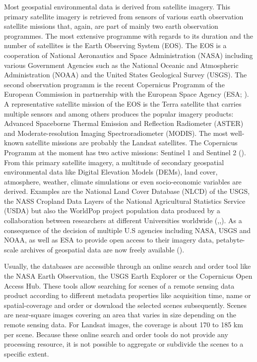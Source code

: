 Most geospatial environmental data is derived from satellite imagery. This primary satellite imagery is retrieved from sensors of various earth observation satellite missions that, again, are part of mainly two earth observation programmes. The most extensive programme with regards to its duration and the number of satellites is the Earth Observing System (EOS). The EOS is a cooperation of National Aeronautics and Space Administration (NASA) including various Government Agencies such as the National Oceanic and Atmospheric Administration (NOAA) and the United States Geological Survey (USGS). The second observation programm is the recent Copernicus Programm of the European Commission in partnership with the European Space Agency (ESA; \cite{salomonson2002overview}). A representative satellite mission of the EOS is the Terra satellite that carries multiple sensors and among others produces the popular imagery products: Advanced Spaceborne Thermal Emission and Reflection Radiometer (ASTER) and Moderate-resolution Imaging Spectroradiometer (MODIS). The most well-known satellite missions are probably the Landsat satellites. The Copernicus Programm at the moment has two active missions: Sentinel 1 and Sentinel 2 (\cite{butler2014earth}).
From this primary satellite imagery, a multitude of secondary geospatial environmental data like Digital Elevation Models (DEMs), land cover, atmosphere, weather, climate simulations or even socio-economic variables are derived. Examples are the National Land Cover Database (NLCD) of the USGS, the NASS Cropland Data Layers of the National Agricultural Statistics Service (USDA) but also the WorldPop project population data produced by a collaboration between researchers at different Universities worldwide (\cite{homer2007completion},\cite{johnson20102009},\cite{tatem2017worldpop}). 
As a consequence of the decision of multiple U.S agencies including NASA, USGS and NOAA, as well as ESA to provide open access to their imagery data, petabyte-scale archives of geospatial data are now freely available (\cite{gorelick2017google}).

Usually, the databases are accessible through an online search and order tool like the NASA Earth Observation, the USGS Earth Explorer or the Copernicus Open Access Hub. These tools allow searching for scenes of a remote sensing data product according to different metadata properties like acquisition time, name or spatial-coverage and order or download the selected scenes subsequently. 
Scenes are near-square images covering an area that varies in size depending on the remote sensing data. For Landsat images, the coverage is about 170 to 185 km per scene. Because these online search and order tools do not provide any processing resource, it is not possible to aggregate or subdivide the scenes to a specific extent.

